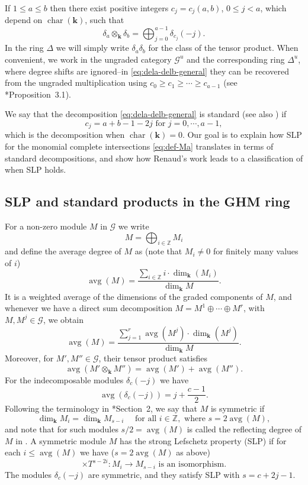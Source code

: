 \documentclass[11pt,reqno]{amsart}
\newcommand{\defi}[1]{{\upshape\sffamily #1}}
\def\kk{{\mathbf k}}
\newcommand{\oo}{\otimes}
\newcommand{\avg}{\operatorname{avg}}
\newcommand{\bb}[1]{\mathbb{#1}}
\newcommand{\mc}[1]{\mathcal{#1}}
\newcommand{\op}[1]{\operatorname{#1}}
\def\lra{\longrightarrow}
\theoremstyle{definition}
\theoremstyle{remark}
\numberwithin{equation}{section}
\begin{document}
If $1\leq a\leq b$ then there exist positive integers $c_j=c_j(a,b)$, $0\leq j<a$, which depend on $\op{char}(\kk)$, such that
\begin{equation}\label{eq:dela-delb-general} \delta_a\oo_{\kk}\delta_b=\bigoplus_{j=0}^{a-1}\delta_{c_j}(-j).
\end{equation}
In the ring $\Delta$ we will simply write $\delta_a\delta_b$ for the class of the tensor product. When convenient, we work in the ungraded category $\mc{G}^u$ and the corresponding ring $\Delta^u$, where degree shifts are ignored--in \eqref{eq:dela-delb-general} they can be recovered from the ungraded multiplication using $c_0 \geq c_1 \geq \cdots \geq c_{a-1}$ (see \cite{KMRR}*{Proposition~3.1}). 

We say that the decomposition \eqref{eq:dela-delb-general} is \defi{standard} (see also \cite{StandardJordan}) if
\begin{equation}\label{eq:standard-cj}
    c_j=a+b-1-2j\text{ for }j=0,\cdots,a-1,
\end{equation}
which is the decomposition when $\op{char}(\kk)=0$. Our goal is to explain how SLP for the monomial complete intersections \eqref{eq:def-Ma} translates in terms of standard decompositions, and show how Renaud's work \cite{renaud} leads to a classification of when SLP holds.

\subsection{SLP and standard products in the GHM ring}
\label{subsec:SLP=standardGHM}

For a non-zero module $M$ in $\mc{G}$ we write 
\[M=\bigoplus_{i\in\bb{Z}} M_i\] 
and define the \defi{average degree of $M$} as (note that $M_i\neq 0$ for finitely many values of $i$)
\begin{equation}\label{eq:def-avg-deg}
    \avg(M) = \frac{\sum_{i\in\bb{Z}} i\cdot \dim_{\kk}(M_i)}{\dim_{\kk}M}.
\end{equation}
It is a weighted average of the dimensions of the graded components of $M$, and whenever we have a direct sum decomposition $M=M^1\oplus\cdots\oplus M^r$, with $M,M^j\in\mc{G}$, we obtain
\begin{equation}\label{eq:av=weightedsum}
    \avg(M) =\frac{\sum_{j=1}^r \avg(M^j)\cdot\dim_{\kk}(M^j)}{\dim_{\kk}M}.
\end{equation}
Moreover, for $M',M''\in\mc{G}$, their tensor product satisfies
\[\avg(M'\oo_\kk M'') = \avg(M')+\avg(M'').\]
For the indecomposable modules $\delta_c(-j)$ we have
\[\avg(\delta_c(-j)) = j+\frac{c-1}{2}.\]
Following the terminology in \cite{harima-watanabe}*{Section~2}, we say that $M$ is \defi{symmetric} if
\[\dim_{\kk}M_i = \dim_{\kk}M_{s-i}\quad\text{ for all }i\in\bb{Z},\text{ where }s=2\avg(M),\]
and note that for such modules $s/2=\avg(M)$ is called the 
\defi{reflecting degree} of $M$ in \cite{harima-watanabe}. A symmetric module $M$ has the \defi{strong Lefschetz property (SLP)} if for each $i\leq\avg(M)$ we have ($s=2\avg(M)$ as above)
\[\times T^{s-2i} : M_i \lra M_{s-i} \text{ is an isomorphism}.\]
The modules $\delta_c(-j)$ are symmetric, and they satisfy SLP with $s=c+2j-1$. 
\end{document}
